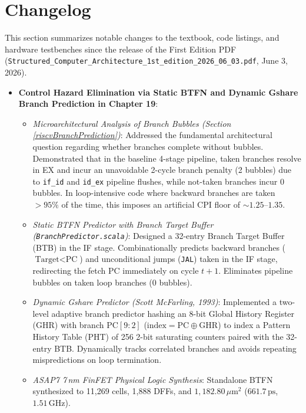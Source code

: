 \chapter*{Changelog}

This section summarizes notable changes to the textbook, code listings, and hardware testbenches since the release of the First Edition PDF (\texttt{Structured\_Computer\_Architecture\_1st\_edition\_2026\_06\_03.pdf}, June 3, 2026).

\begin{itemize}
    \item \textbf{Control Hazard Elimination via Static BTFN and Dynamic Gshare Branch Prediction in Chapter 19}:
    \begin{itemize}
        \item \textit{Microarchitectural Analysis of Branch Bubbles (Section \ref{riscvBranchPrediction})}: Addressed the fundamental architectural question regarding whether branches complete without bubbles. Demonstrated that in the baseline 4-stage pipeline, taken branches resolve in EX and incur an unavoidable 2-cycle branch penalty (2 bubbles) due to \texttt{if\_id} and \texttt{id\_ex} pipeline flushes, while not-taken branches incur 0 bubbles. In loop-intensive code where backward branches are taken $>95\%$ of the time, this imposes an artificial CPI floor of $\sim 1.25\text{--}1.35$.
        \item \textit{Static BTFN Predictor with Branch Target Buffer (\texttt{BranchPredictor.scala})}: Designed a 32-entry Branch Target Buffer (BTB) in the IF stage. Combinationally predicts backward branches ($\text{Target} < \text{PC}$) and unconditional jumps (\texttt{JAL}) taken in the IF stage, redirecting the fetch PC immediately on cycle $t+1$. Eliminates pipeline bubbles on taken loop branches (0 bubbles).
        \item \textit{Dynamic Gshare Predictor (Scott McFarling, 1993)}: Implemented a two-level adaptive branch predictor hashing an 8-bit Global History Register (GHR) with branch $\text{PC}[9:2]$ ($\text{index} = \text{PC} \oplus \text{GHR}$) to index a Pattern History Table (PHT) of 256 2-bit saturating counters paired with the 32-entry BTB. Dynamically tracks correlated branches and avoids repeating mispredictions on loop termination.
        \item \textit{ASAP7 7\,nm FinFET Physical Logic Synthesis}:
        Standalone BTFN synthesized to 11,269 cells, 1,888 DFFs, and $1,182.80\,\mu\text{m}^2$ ($661.7\,\text{ps}$, $1.51\,\text{GHz}$).

\end{itemize}
\end{itemize}
